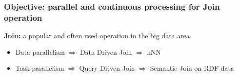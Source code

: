 \begin{frame}
\frametitle{Objective: parallel and continuous processing for Join operation}
\textbf{Join: } a popular and often used operation in the big data area.

\begin{itemize}
\item Data parallelism $\Rightarrow$ Data Driven Join $\Rightarrow$ kNN
\item Task parallelism $\Rightarrow$ Query Driven Join $\Rightarrow$ Semantic Join on RDF data
\end{itemize} 

\end{frame}